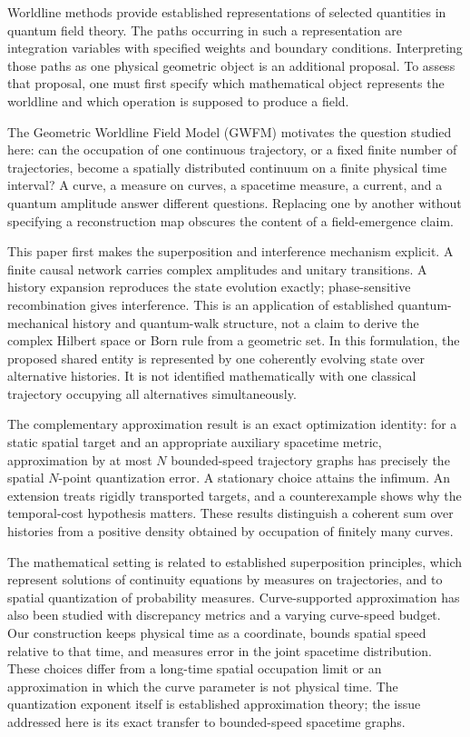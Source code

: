 \documentclass[aip,jmp,reprint,onecolumn,amsmath,amssymb]{revtex4-2}
\theoremstyle{definition}
\begin{document}
Worldline methods provide established representations of selected quantities in quantum field theory.\cite{schubert,strassler} The paths occurring in such a representation are integration variables with specified weights and boundary conditions. Interpreting those paths as one physical geometric object is an additional proposal. To assess that proposal, one must first specify which mathematical object represents the worldline and which operation is supposed to produce a field.

The Geometric Worldline Field Model (GWFM) motivates the question studied here: can the occupation of one continuous trajectory, or a fixed finite number of trajectories, become a spatially distributed continuum on a finite physical time interval? A curve, a measure on curves, a spacetime measure, a current, and a quantum amplitude answer different questions. Replacing one by another without specifying a reconstruction map obscures the content of a field-emergence claim.

This paper first makes the superposition and interference mechanism explicit. A finite causal network carries complex amplitudes and unitary transitions. A history expansion reproduces the state evolution exactly; phase-sensitive recombination gives interference. This is an application of established quantum-mechanical history and quantum-walk structure,\cite{feynmanpath,aharonov,kempe} not a claim to derive the complex Hilbert space or Born rule from a geometric set. In this formulation, the proposed shared entity is represented by one coherently evolving state over alternative histories. It is not identified mathematically with one classical trajectory occupying all alternatives simultaneously.

The complementary approximation result is an exact optimization identity: for a static spatial target and an appropriate auxiliary spacetime metric, approximation by at most $N$ bounded-speed trajectory graphs has precisely the spatial $N$-point quantization error. A stationary choice attains the infimum. An extension treats rigidly transported targets, and a counterexample shows why the temporal-cost hypothesis matters. These results distinguish a coherent sum over histories from a positive density obtained by occupation of finitely many curves.

The mathematical setting is related to established superposition principles, which represent solutions of continuity equations by measures on trajectories,\cite{stepanov,miller} and to spatial quantization of probability measures.\cite{kloeckner} Curve-supported approximation has also been studied with discrepancy metrics and a varying curve-speed budget.\cite{ehler} Our construction keeps physical time as a coordinate, bounds spatial speed relative to that time, and measures error in the joint spacetime distribution. These choices differ from a long-time spatial occupation limit or an approximation in which the curve parameter is not physical time. The quantization exponent itself is established approximation theory; the issue addressed here is its exact transfer to bounded-speed spacetime graphs.
\end{document}
